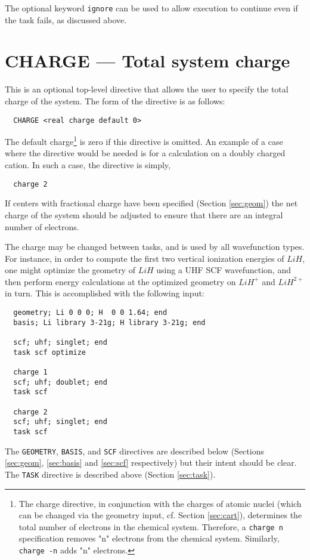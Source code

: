 The optional keyword \verb+ignore+ can be used to allow execution to
continue even if the task fails, as discussed above.

\section{CHARGE --- Total system charge}
\label{sec:charge}

This is an optional top-level directive that allows the user to specify
the total charge of the system.  The form of the directive is as follows:
\begin{verbatim}
  CHARGE <real charge default 0>
\end{verbatim}

The default charge\footnote{The charge directive, in conjunction with
  the charges of atomic nuclei (which can be changed via the geometry
  input, cf. Section \ref{sec:cart}), determines the total number of
  electrons in the chemical system.  Therefore, a {\tt charge n}
  specification removes "n" electrons from the chemical system.
  Similarly, {\tt charge -n} adds "n" electrons.} is zero
if this directive is omitted.  An example of a case where the
directive would be needed is for a calculation on a doubly charged
cation.  In such a case, the directive is simply,
\begin{verbatim}
  charge 2
\end{verbatim}

If centers with fractional charge have been specified (Section
\ref{sec:geom}) the net charge of the system should be adjusted to
ensure that there are an integral number of electrons.

The charge may be changed between tasks, and is used by all
wavefunction types.  For instance, in order to compute the first two
vertical ionization energies of $LiH$, one might optimize the geometry
of $LiH$ using a UHF SCF wavefunction, and then perform energy
calculations at the optimized geometry on $LiH^+$ and
$LiH^{2+}$ in turn.  This is accomplished with the following input:
\begin{verbatim}
  geometry; Li 0 0 0; H  0 0 1.64; end
  basis; Li library 3-21g; H library 3-21g; end

  scf; uhf; singlet; end
  task scf optimize

  charge 1
  scf; uhf; doublet; end
  task scf

  charge 2
  scf; uhf; singlet; end
  task scf
\end{verbatim}
The \verb+GEOMETRY+, \verb+BASIS+, and \verb+SCF+ directives are
described below (Sections \ref{sec:geom}, \ref{sec:basis} and
\ref{sec:scf} respectively) but their intent should be clear.  The
\verb+TASK+ directive is described above (Section \ref{sec:task}).  



